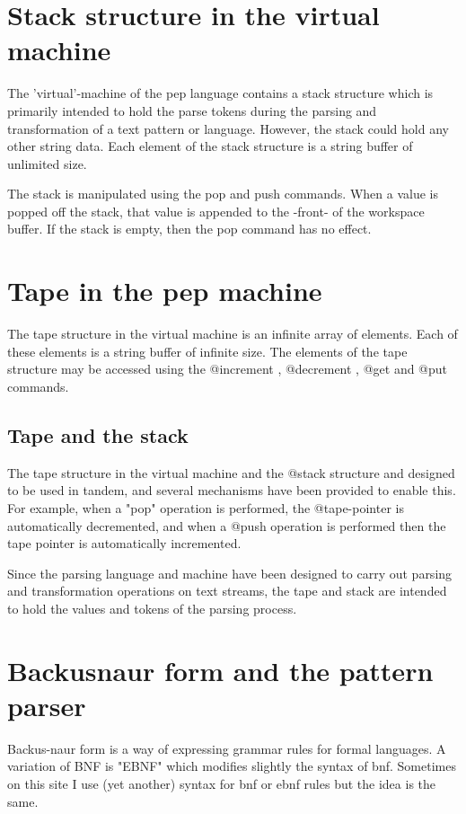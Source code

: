 \documentclass[a4paper,12pt]{article}
\begin{document}
\section{Stack structure in the virtual machine}

  The 'virtual'-machine of the pep language contains
  a stack structure which is primarily intended to hold
  the parse tokens during the parsing and transformation
  of a text pattern or language. However, the stack
  could hold any other string data. Each element of the
  stack structure is a string buffer of unlimited size.

  The stack is manipulated using the pop and push commands.
  When a value is popped off the stack, that value is appended
  to the -front- of the workspace buffer. If the stack is
  empty, then the pop command has no effect.

\section{Tape in the pep machine}

 The tape structure in the virtual machine is an infinite
 array of elements. Each of these elements is a string buffer
 of infinite size. The elements of the tape structure may be
 accessed using the @increment , @decrement , @get and @put
 commands.

\subsection{Tape and the stack}

 The tape structure in the virtual machine and the @stack
 structure and designed to be used in tandem, and several
 mechanisms have been provided to enable this. For example,
 when a "pop" operation is performed, the @tape-pointer is
 automatically decremented, and when a @push operation is
 performed then the tape pointer is automatically incremented.

 Since the parsing language and machine have been designed
 to carry out parsing and transformation operations on
 text streams, the tape and stack are intended to hold
 the values and tokens of the parsing process.
 
\section{Backusnaur form and the pattern parser}

  Backus-naur form is a way of expressing grammar rules for formal languages.
  A variation of BNF is "EBNF" which modifies slightly the syntax of bnf.
  Sometimes on this site I use (yet another) syntax for bnf or ebnf rules but
  the idea is the same.
\end{document}
